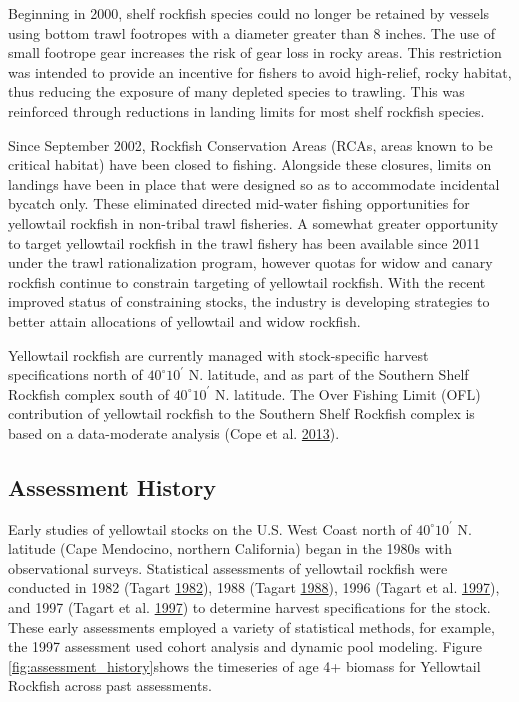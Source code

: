 \documentclass[12pt,]{article}
\begin{document}
Beginning in 2000, shelf rockfish species could no longer be retained by
vessels using bottom trawl footropes with a diameter greater than 8
inches. The use of small footrope gear increases the risk of gear loss
in rocky areas. This restriction was intended to provide an incentive
for fishers to avoid high-relief, rocky habitat, thus reducing the
exposure of many depleted species to trawling. This was reinforced
through reductions in landing limits for most shelf rockfish species.

Since September 2002, Rockfish Conservation Areas (RCAs, areas known to
be critical habitat) have been closed to fishing. Alongside these
closures, limits on landings have been in place that were designed so as
to accommodate incidental bycatch only. These eliminated directed
mid-water fishing opportunities for yellowtail rockfish in non-tribal
trawl fisheries. A somewhat greater opportunity to target yellowtail
rockfish in the trawl fishery has been available since 2011 under the
trawl rationalization program, however quotas for widow and canary
rockfish continue to constrain targeting of yellowtail rockfish. With
the recent improved status of constraining stocks, the industry is
developing strategies to better attain allocations of yellowtail and
widow rockfish.

Yellowtail rockfish are currently managed with stock-specific harvest
specifications north of \(40^\circ 10^\prime\) N. latitude, and as part
of the Southern Shelf Rockfish complex south of \(40^\circ 10^\prime\)
N. latitude. The Over Fishing Limit (OFL) contribution of yellowtail
rockfish to the Southern Shelf Rockfish complex is based on a
data-moderate analysis (Cope et al.
\protect\hyperlink{ref-Cope2013}{2013}).

\subsection{Assessment History}\label{assessment-history}

Early studies of yellowtail stocks on the U.S. West Coast north of
\(40^\circ 10^\prime\) N. latitude (Cape Mendocino, northern California)
began in the 1980s with observational surveys. Statistical assessments
of yellowtail rockfish were conducted in 1982 (Tagart
\protect\hyperlink{ref-Tagart1982}{1982}), 1988 (Tagart
\protect\hyperlink{ref-Tagart1988}{1988}), 1996 (Tagart et al.
\protect\hyperlink{ref-Tagart1997}{1997}), and 1997 (Tagart et al.
\protect\hyperlink{ref-Tagart1997}{1997}) to determine harvest
specifications for the stock. These early assessments employed a variety
of statistical methods, for example, the 1997 assessment used cohort
analysis and dynamic pool modeling. Figure
\ref{fig:assessment_history}shows the timeseries of age 4+ biomass for
Yellowtail Rockfish across past assessments.
\end{document}
